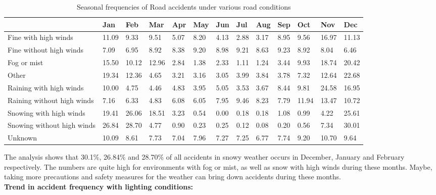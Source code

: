 \documentclass[a4paper, 10pt]{article}
\begin{document}
\begin {table}[H]
 \caption {Seasonal frequencies of Road accidents under various road conditions} \label{tab:title} 
    \begin{center}
 \begin{tabular}{l l l l l l l l l l l l l  } 
  \hline
 & Jan & Feb & Mar & Apr & May & Jun & Jul & Aug & Sep & Oct & Nov & Dec \\ 
 \hline
Fine with high winds&11.09&9.33&9.51&5.07&8.20&4.13&2.88&3.17&8.95&9.56&16.97&11.13\\
Fine without high winds&7.09&6.95&8.92&8.38&9.20&8.98&9.21&8.63&9.23&8.92&8.04&6.46\\
Fog or mist&15.50&10.12&12.96&2.84&1.38&2.33&1.11&1.24&3.44&9.93&18.74&20.42\\
Other&19.34&12.36&4.65&3.21&3.16&3.05&3.99&3.84&3.78&7.32&12.64&22.68\\
Raining with high winds&10.00&4.75&4.46&4.83&3.95&5.05&3.53&3.67&8.44&9.81&24.58&16.95\\
Raining without high winds&7.16&6.33&4.83&6.08&6.05&7.95&9.46&8.23&7.79&11.94&13.47&10.72\\
Snowing with high winds&19.41&26.06&18.51&3.23&0.54&0.00&0.18&0.18&1.08&0.99&4.22&25.61\\
Snowing without high winds&26.84&28.70&4.77&0.90&0.23&0.25&0.12&0.08&0.20&0.56&7.34&30.01\\
Unknown&10.09&8.61&7.73&7.04&7.96&7.27&7.25&6.77&7.74&9.20&10.70&9.64\\
 \hline
\end{tabular}
  \end{center}
\end {table}

   The analysis shows that 30.1\%, 26.84\% and 28.70\% of all accidents in snowy weather occurs in December, January and February respectively. The numbers are quite high for environments with
   fog or mist, as well as snow with high winds during these months. Maybe, taking more precautions and safety measures for the weather can bring down accidents during these months. \\

   \textbf{Trend in accident frequency with lighting conditions:}
\end{document}
